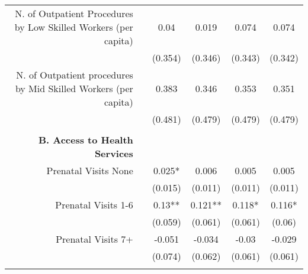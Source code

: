 \begin{table}[h!]
\begin{footnotesize}
\begin{center}
{\begin{threeparttable}[b]
\begin{tabular}{rrrrrr}
    \multicolumn{1}{p{26.355em}}{N. of Outpatient Procedures by Low Skilled Workers (per capita)} &       & \multicolumn{1}{c}{0.04} & \multicolumn{1}{c}{0.019} & \multicolumn{1}{c}{0.074} & \multicolumn{1}{c}{ 0.074 } \\
          &       & \multicolumn{1}{c}{(0.354)} & \multicolumn{1}{c}{(0.346)} & \multicolumn{1}{c}{(0.343)} & \multicolumn{1}{c}{ (0.342) } \\
    \multicolumn{1}{p{26.355em}}{N. of Outpatient procedures by Mid Skilled Workers (per capita)} &       & \multicolumn{1}{c}{0.383} & \multicolumn{1}{c}{0.346} & \multicolumn{1}{c}{0.353} & \multicolumn{1}{c}{ 0.351 } \\
          &       & \multicolumn{1}{c}{(0.481)} & \multicolumn{1}{c}{(0.479)} & \multicolumn{1}{c}{(0.479)} & \multicolumn{1}{c}{ (0.479) } \\
          &       &       &       &       &  \\
    \midrule
    \multicolumn{1}{p{26.355em}}{\textbf{B. Access to Health Services}} &       &       &       &       &  \\
    \multicolumn{1}{p{26.355em}}{Prenatal Visits None} &       & \multicolumn{1}{c}{0.025*} & \multicolumn{1}{c}{0.006} & \multicolumn{1}{c}{0.005} & \multicolumn{1}{c}{0.005} \\
          &       & \multicolumn{1}{c}{(0.015)} & \multicolumn{1}{c}{(0.011)} & \multicolumn{1}{c}{(0.011)} & \multicolumn{1}{c}{(0.011)} \\
    \multicolumn{1}{p{26.355em}}{Prenatal Visits 1-6} &       & \multicolumn{1}{c}{0.13**} & \multicolumn{1}{c}{0.121**} & \multicolumn{1}{c}{0.118*} & \multicolumn{1}{c}{0.116*} \\
          &       & \multicolumn{1}{c}{(0.059)} & \multicolumn{1}{c}{(0.061)} & \multicolumn{1}{c}{(0.061)} & \multicolumn{1}{c}{(0.06)} \\
    \multicolumn{1}{p{26.355em}}{Prenatal Visits 7+} &       & \multicolumn{1}{c}{-0.051} & \multicolumn{1}{c}{-0.034} & \multicolumn{1}{c}{-0.03} & \multicolumn{1}{c}{-0.029} \\
          &       & \multicolumn{1}{c}{(0.074)} & \multicolumn{1}{c}{(0.062)} & \multicolumn{1}{c}{(0.061)} & \multicolumn{1}{c}{(0.061)} \\
          &       &       &       &       &  \\
    \bottomrule
    \bottomrule
    \end{tabular}%
    

\end{threeparttable}}
\end{center}
\end{footnotesize}
\end{table}
